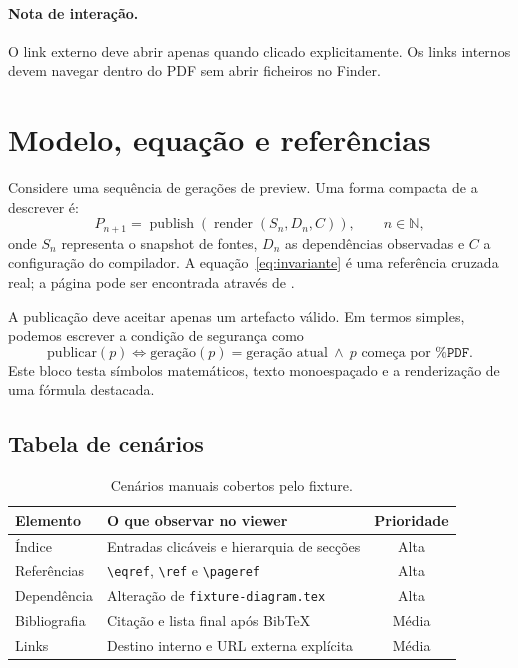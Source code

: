 \documentclass[11pt,a4paper]{article}
\begin{document}
\paragraph{Nota de interação.}
O link externo deve abrir apenas quando clicado explicitamente. Os links
internos devem navegar dentro do PDF sem abrir ficheiros no Finder.

\newpage
\section{Modelo, equação e referências}
\label{sec:matematica}

Considere uma sequência de gerações de preview. Uma forma compacta de a
descrever é:
\begin{equation}
  P_{n+1} = \operatorname{publish}\!\left(\operatorname{render}(S_n,D_n,C)\right),
  \qquad n \in \mathbb{N},
  \label{eq:invariante}
\end{equation}
onde $S_n$ representa o snapshot de fontes, $D_n$ as dependências observadas e
$C$ a configuração do compilador. A equação~\eqref{eq:invariante} é uma
referência cruzada real; a página pode ser encontrada através de
\pageref{eq:invariante}.

A publicação deve aceitar apenas um artefacto válido. Em termos simples,
podemos escrever a condição de segurança como
\[
  \text{publicar}(p) \Longleftrightarrow
  \text{geração}(p)=\text{geração atual}\ \land\ p\text{ começa por }\texttt{\%PDF}.
\]
Este bloco testa símbolos matemáticos, texto monoespaçado e a renderização de
uma fórmula destacada.

\subsection{Tabela de cenários}
\label{subsec:tabela}

\begin{table}[ht]
  \centering
  \caption{Cenários manuais cobertos pelo fixture.}
  \label{tab:cenarios}
  \begin{tabular}{@{}>{\raggedright\arraybackslash}p{3.4cm}p{7.6cm}c@{}}
    \toprule
    Elemento & O que observar no viewer & Prioridade \\
    \midrule
    Índice & Entradas clicáveis e hierarquia de secções & Alta \\
    Referências & \verb|\eqref|, \verb|\ref| e \verb|\pageref| & Alta \\
    Dependência & Alteração de \texttt{fixture-diagram.tex} & Alta \\
    Bibliografia & Citação e lista final após BibTeX & Média \\
    Links & Destino interno e URL externa explícita & Média \\
    \bottomrule
  \end{tabular}
\end{table}
\end{document}
